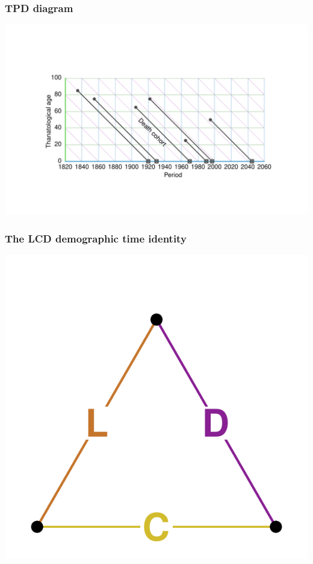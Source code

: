 \documentclass[20pt]{beamer}
\begin{document}

\begin{frame}
\frametitle{TPD diagram}
\begin{center}
\includegraphics[trim= 200 200 200 200, scale=1.5]{Figures/TPDrt.pdf}
\end{center}
\end{frame}


\begin{frame}
\frametitle{The LCD demographic time identity}
\vspace{-4em}
\begin{center}
\includegraphics[scale=1.7]{Figures/LCDid.pdf}
\end{center}
\end{frame}
\end{document}

